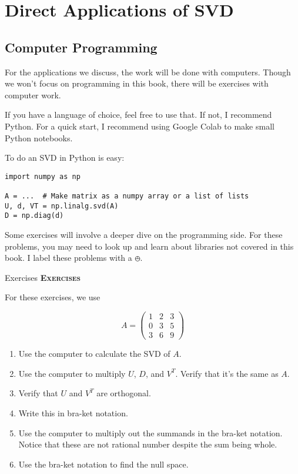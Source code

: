 \documentclass{amsbook}
\begin{document}
\chapter{Direct Applications of SVD}

\section{Computer Programming}
\label{computer_section}

For the applications we discuss, the work will be done with computers.  Though we won't focus on programming in this book, there will be exercises with computer work.

If you have a language of choice, feel free to use that.  If not, I recommend Python.  For a quick start, I recommend using Google Colab to make small Python notebooks.

To do an SVD in Python is easy:

\begin{lstlisting}
import numpy as np

A = ...  # Make matrix as a numpy array or a list of lists
U, d, VT = np.linalg.svd(A)
D = np.diag(d)
\end{lstlisting}

Some exercises will involve a deeper dive on the programming side.  For these problems, you may need to look up and learn about libraries not covered in this book.  I label these problems with a $\obot$.

Exercises
{\bfseries\scshape\Large Exercises}

For these exercises, we use

$$
A = \left(\begin{array}{ccc} 1 & 2 & 3 \\ 0 & 3 & 5 \\ 3 & 6 & 9 \end{array}\right)
$$

\begin{enumerate}
\item Use the computer to calculate the SVD of $A$.
\item Use the computer to multiply $U$, $D$, and $V^T$.  Verify that it's the same as $A$.
\item Verify that $U$ and $V^T$ are orthogonal.
\item Write this in bra-ket notation.
\item \label{irrational_summands} Use the computer to multiply out the summands in the bra-ket notation.  Notice that these are not rational number despite the sum being whole.
\item Use the bra-ket notation to find the null space.
\end{enumerate}
\end{document}
